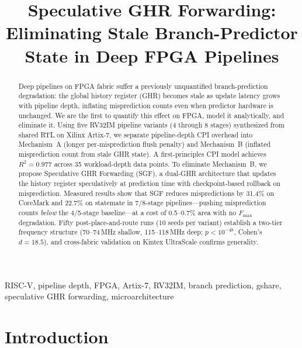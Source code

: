 \documentclass[journal]{IEEEtran}
\begin{document}
\title{Speculative GHR Forwarding: Eliminating Stale Branch-Predictor State in Deep FPGA Pipelines}

\author{
}

\maketitle

\begin{abstract}
Deep pipelines on FPGA fabric suffer a previously unquantified branch-prediction degradation: the global history register (GHR) becomes stale as update latency grows with pipeline depth, inflating misprediction counts even when predictor hardware is unchanged. We are the first to quantify this effect on FPGA, model it analytically, and eliminate it. Using five RV32IM pipeline variants (4 through 8 stages) synthesized from shared RTL on Xilinx Artix-7, we separate pipeline-depth CPI overhead into Mechanism~A (longer per-misprediction flush penalty) and Mechanism~B (inflated misprediction count from stale GHR state). A first-principles CPI model achieves $R^2 = 0.977$ across 35 workload-depth data points. To eliminate Mechanism~B, we propose Speculative GHR Forwarding (SGF), a dual-GHR architecture that updates the history register speculatively at prediction time with checkpoint-based rollback on misprediction. Measured results show that SGF reduces mispredictions by 31.4\% on CoreMark and 22.7\% on statemate in 7/8-stage pipelines---pushing misprediction counts \emph{below} the 4/5-stage baseline---at a cost of 0.5--0.7\% area with no $F_{\max}$ degradation. Fifty post-place-and-route runs (10 seeds per variant) establish a two-tier frequency structure (70--74\,MHz shallow, 115--118\,MHz deep; $p < 10^{-48}$, Cohen's $d = 18.5$), and cross-fabric validation on Kintex UltraScale confirms generality.
\end{abstract}

\begin{IEEEkeywords}
RISC-V, pipeline depth, FPGA, Artix-7, RV32IM, branch prediction, gshare, speculative GHR forwarding, microarchitecture
\end{IEEEkeywords}

\section{Introduction}
\end{document}
